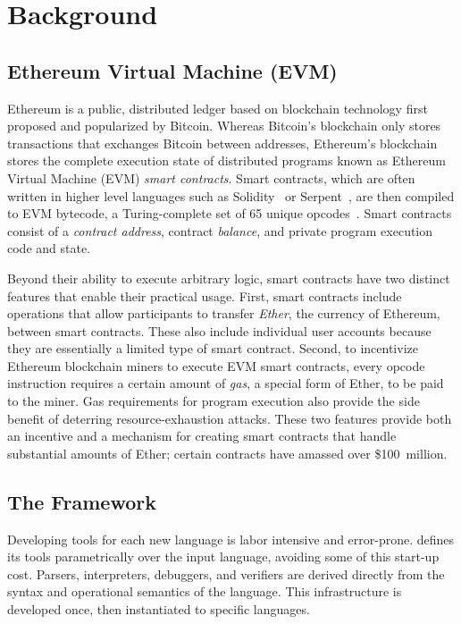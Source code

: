 \section{Background}

\subsection{Ethereum Virtual Machine (EVM)}

Ethereum is a public, distributed ledger based on blockchain technology first
proposed and popularized by Bitcoin. Whereas Bitcoin's blockchain only stores
transactions that exchanges Bitcoin between addresses, Ethereum's blockchain
stores the complete execution state of distributed programs known as Ethereum
Virtual Machine (EVM) \textit{smart contracts}. Smart contracts, which are often
written in higher level languages such as Solidity~\cite{solidity} or
Serpent~\cite{serpent}, are then compiled to EVM
bytecode, a Turing-complete set of 65 unique opcodes~\cite{wood2014ethereum}. Smart
contracts consist of a \textit{contract address}, contract \textit{balance}, and
private program execution code and state.

Beyond their ability to execute arbitrary logic, smart contracts have two
distinct features that enable their practical usage. First, smart contracts
include operations that allow participants to transfer \textit{Ether}, the
currency of Ethereum, between smart contracts. These also include individual user
accounts because they are essentially a limited type of smart contract. Second, to
incentivize Ethereum blockchain miners to execute EVM smart contracts, every
opcode instruction requires a certain amount of \textit{gas}, a special form of
Ether, to be paid to the miner. Gas requirements for program execution also
provide the side benefit of deterring resource-exhaustion attacks. These two
features provide both an incentive and a mechanism for creating smart contracts
that handle substantial amounts of Ether; certain contracts have
amassed over \$100~million.

\subsection{The \K{} Framework}

Developing tools for each new language is labor intensive and error-prone. \K{}
defines its tools parametrically over the input language, avoiding some of this
start-up cost. Parsers, interpreters, debuggers, and verifiers are derived
directly from the syntax and operational semantics of the language. This
infrastructure is developed once, then instantiated to specific
languages.~\cite{stefanescu-park-yuwen-li-rosu-2016-oopsla}

